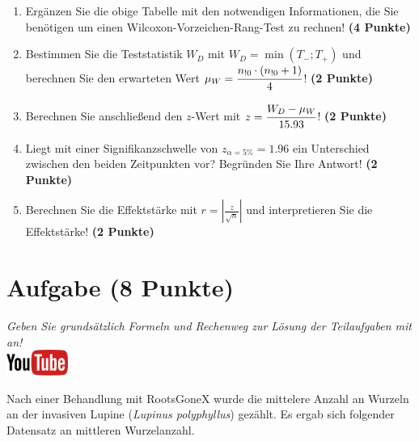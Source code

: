 \documentclass[a4paper, 9pt]{scrartcl}\usepackage[]{graphicx}\usepackage[]{xcolor}
\begin{document}
\begin{enumerate}
\item Erg{\"a}nzen Sie die obige Tabelle mit den notwendigen Informationen, die
  Sie ben{\"o}tigen um einen Wilcoxon-Vorzeichen-Rang-Test zu rechnen!
  \textbf{(4 Punkte)}
\item Bestimmen Sie die Teststatistik $W_D$ mit $W_D = \min(T_{-}; T_{+})$ und
  berechnen Sie den erwarteten Wert $\mu_W = \cfrac{n_{!0} \cdot (n_{!0} + 1)}{4}$!
  \textbf{(2 Punkte)}
\item Berechnen Sie anschlie{\ss}end den $z$-Wert mit $z = \cfrac{W_D -
    \mu_W}{15.93}$! \textbf{(2 Punkte)}
\item Liegt mit einer Signifikanzschwelle von $z_{\alpha = 5\%} =
  1.96$ ein Unterschied zwischen den beiden Zeitpunkten vor? Begr{\"u}nden Sie
  Ihre Antwort! \textbf{(2 Punkte)} 
\item Berechnen Sie die Effektst{\"a}rke mit $r = |\frac{z}{\sqrt{n}}| $ und
  interpretieren Sie die Effektst{\"a}rke! \textbf{(2 Punkte)} 
\end{enumerate} 
\clearpage

\section{Aufgabe \hfill (8 Punkte)}

\textit{Geben Sie grunds{\"a}tzlich Formeln und Rechenweg zur L{\"o}sung der
  Teilaufgaben mit an!} \\[1Ex]

\hfill\href{https://youtu.be/5tiJFxuZcco}{\includegraphics[width =
  2cm]{img/youtube}} %
\hspace{2Ex}




Nach einer Behandlung mit RootsGoneX wurde die mittelere Anzahl an Wurzeln
an der invasiven Lupine (\textit{Lupinus polyphyllus}) gez{\"a}hlt. Es ergab sich
folgender Datensatz an mittleren Wurzelanzahl.
\end{document}
